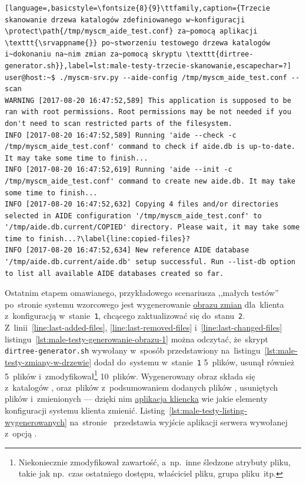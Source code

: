 \documentclass[thesis]{subfiles}
\begin{document}
\begin{minipage}{\linewidth}
\begin{lstlisting}[language=,basicstyle=\fontsize{8}{9}\ttfamily,caption={Trzecie skanowanie drzewa katalogów zdefiniowanego w~konfiguracji \protect\path{/tmp/myscm_aide_test.conf} za~pomocą aplikacji \texttt{\srvappname{}} po~stworzeniu testowego drzewa katalogów i~dokonaniu na~nim zmian za~pomocą skryptu \texttt{dirtree-generator.sh}},label=lst:male-testy-trzecie-skanowanie,escapechar=?]
user@host:~$ ./myscm-srv.py --aide-config /tmp/myscm_aide_test.conf --scan
WARNING [2017-08-20 16:47:52,589] This application is supposed to be ran with root permissions. Root permissions may be not needed if you don't need to scan restricted parts of the filesystem.
INFO [2017-08-20 16:47:52,589] Running 'aide --check -c /tmp/myscm_aide_test.conf' command to check if aide.db is up-to-date. It may take some time to finish...
INFO [2017-08-20 16:47:52,619] Running 'aide --init -c /tmp/myscm_aide_test.conf' command to create new aide.db. It may take some time to finish...
INFO [2017-08-20 16:47:52,632] Copying 4 files and/or directories selected in AIDE configuration '/tmp/myscm_aide_test.conf' to '/tmp/aide.db.current/COPIED' directory. Please wait, it may take some time to finish...?\label{line:copied-files}?
INFO [2017-08-20 16:47:52,634] New reference AIDE database '/tmp/aide.db.current/aide.db' setup successful. Run --list-db option to list all available AIDE databases created so far.
\end{lstlisting}
\end{minipage}

Ostatnim etapem omawianego, przykładowego scenariusza ,,małych testów'' po~stronie systemu wzorcowego jest wygenerowanie \hyperref[sec:obraz-zmian-konfiguracji]{obrazu zmian} dla~klienta z~konfiguracją w~stanie~\texttt{1}, chcącego zaktualizować się do~stanu~\texttt{2}. Z~linii~\ref{line:last-added-files}, \ref{line:last-removed-files} i~\ref{line:last-changed-files} listingu~\ref{lst:male-testy-generowanie-obrazu-1} można odczytać, że~skrypt \texttt{dirtree-generator.sh} wywołany w~sposób przedstawiony na~listingu~\ref{lst:male-testy-zmiany-w-drzewie} dodał do~systemu w~stanie~\texttt{1} 5~plików, usunął również 5~plików i~zmodyfikował\footnote{Niekoniecznie zmodyfikował zawartość, a~np.~inne śledzone atrybuty pliku, takie jak np.~czas ostatniego dostępu, właściciel pliku, grupa pliku~itp.} 10~plików. Wygenerowany obraz  składa się z~katalogów ,  oraz~plików z~podsumowaniem dodanych plików , usuniętych plików  i~zmienionych  --- dzięki nim \hyperref[sec:cli-app]{aplikacja kliencka} wie jakie elementy konfiguracji systemu klienta zmienić. Listing~\ref{lst:male-testy-listing-wygenerowanych} na~stronie~\pageref{lst:male-testy-listing-wygenerowanych} przedstawia wyjście aplikacji serwera wywołanej z~opcją .
\end{document}

